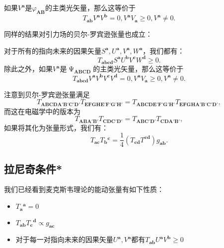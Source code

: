\begin{them}[label={them:6.3}]{}
	如果$V^{\boldsymbol{a}}$是$\varphi _{\boldsymbol{AB}}$的主类光矢量，那么这等价于
	\begin{equation*}
		T_{\boldsymbol{ab}} V^{\boldsymbol{a}} V^{\boldsymbol{b}} =0,V^{\boldsymbol{a}} V_{\boldsymbol{a}} \geq 0,V^{\boldsymbol{a}} \neq 0.
	\end{equation*}
\end{them}
同样的结果对引力场的贝尔-罗宾逊张量也成立：
\begin{them}[label={them:6.4}]{}
	对于所有的指向未来的因果矢量$S^{\boldsymbol{a}} ,U^{\boldsymbol{a}} ,V^{\boldsymbol{a}} ,W^{\boldsymbol{a}}$，我们都有：
	\begin{equation*}
		T_{\boldsymbol{abcd}} S^{\boldsymbol{a}} U^{\boldsymbol{b}} V^{\boldsymbol{c}} W^{\boldsymbol{d}} \geq 0.
	\end{equation*}
	除此之外，如果$V^{\boldsymbol{a}}$是$\upPsi _{\boldsymbol{ABCD}}$的主类光矢量，那么这等价于
	\begin{equation*}
		T_{\boldsymbol{abcd}} V^{\boldsymbol{a}} V^{\boldsymbol{b}} V^{\boldsymbol{c}} V^{\boldsymbol{d}} =0,V^{\boldsymbol{a}} V_{\boldsymbol{a}} \geq 0,V^{\boldsymbol{a}} \neq 0.
	\end{equation*}
\end{them}
注意到贝尔-罗宾逊张量满足
\begin{equation*}
	T\boldsymbol{_{ABCDA'B'C'D'}} T\boldsymbol{_{EFGHE'F'G'H'}} =T\boldsymbol{_{ABCDE'F'G'H'}} T\boldsymbol{_{EFGHA'B'C'D'}} ,
\end{equation*}
而这在电磁学中的版本为
\begin{equation*}
	T_{\boldsymbol{ABA} '\boldsymbol{B} '} T_{\boldsymbol{CDC} '\boldsymbol{D} '} =T_{\boldsymbol{ABC} '\boldsymbol{D} '} T_{\boldsymbol{CDA} '\boldsymbol{B} '} ,
\end{equation*}
如果将其化为张量形式，我们有：
\begin{equation*}
	T_{\boldsymbol{ac}} T{_{\boldsymbol{b}}}^{\boldsymbol{c}} =\frac{1}{4} (T_{\boldsymbol{cd}} T^{\boldsymbol{cd}} )g_{\boldsymbol{ab}} .
\end{equation*}

\subsection{拉尼奇条件*}

我们已经看到麦克斯韦理论的能动张量有如下性质：
\begin{itemize}
	\item $T{_{\boldsymbol{a}}}^{\boldsymbol{a}} =0$
	\item $T_{\boldsymbol{ab}} T{_{\boldsymbol{c}}}^{\boldsymbol{d}} \propto g_{\boldsymbol{ac}}$
	\item 对于每一对指向未来的因果矢量$U^{\boldsymbol{a}} ,V^{\boldsymbol{a}}$都有$T_{\boldsymbol{ab}} U^{\boldsymbol{a}} V^{\boldsymbol{b}} \geq 0$
\end{itemize}

